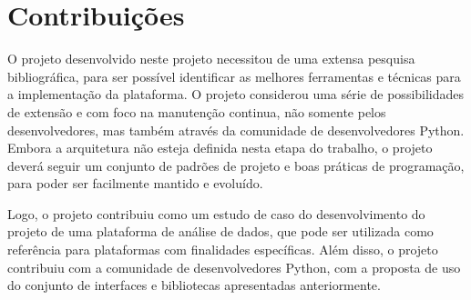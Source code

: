 

\section{Contribuições}
    \label{sec:contribuicoes}

    O projeto desenvolvido neste projeto necessitou de uma extensa pesquisa bibliográfica, para ser possível identificar as melhores ferramentas e técnicas para a implementação da plataforma. O projeto considerou uma série de possibilidades de extensão e com foco na manutenção continua, não somente pelos desenvolvedores, mas também através da comunidade de desenvolvedores Python. Embora a arquitetura não esteja definida nesta etapa do trabalho, o projeto deverá seguir um conjunto de padrões de projeto e boas práticas de programação, para poder ser facilmente mantido e evoluído.

    Logo, o projeto contribuiu como um estudo de caso do desenvolvimento do projeto de uma plataforma de análise de dados, que pode ser utilizada como referência para plataformas com finalidades específicas. Além disso, o projeto contribuiu com a comunidade de desenvolvedores Python, com a proposta de uso do conjunto de interfaces e bibliotecas apresentadas anteriormente.
